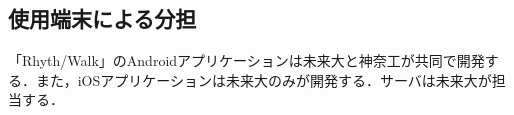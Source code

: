 \subsection{使用端末による分担}
\par
「Rhyth/Walk」のAndroidアプリケーションは未来大と神奈工が共同で開発する．また，iOSアプリケーションは未来大のみが開発する．サーバは未来大が担当する．
